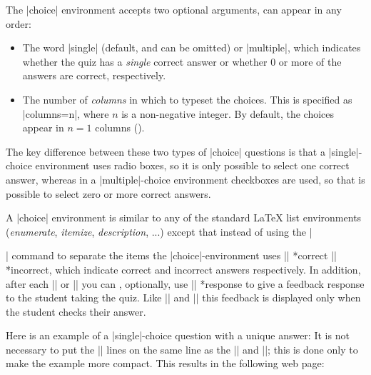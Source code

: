 \documentclass[svgnames]{article}
\begin{document}
The \LatexCode|choice| environment accepts two optional arguments,
can appear in any order:
\begin{itemize}
  \item{}
  The word \LatexCode|single| (default, and can be omitted) or
  \LatexCode|multiple|, which indicates whether the quiz has a
  \textit{single} correct answer or whether 0 or more of the answers are
  correct, respectively.
  \item {}
  The number of \textit{columns} in which to typeset the choices. This
  is specified as \LatexCode|columns=n|, where $n$ is a non-negative integer.
  By default, the choices appear in $n=1$ columns
  ().
\end{itemize}
The key difference between these two types of \LatexCode|choice|
questions is that a \LatexCode|single|-choice environment uses radio
boxes, so it is only possible to select one correct answer, whereas in a
\LatexCode|multiple|-choice environment checkboxes are used, so that is
possible to select zero or more correct answers.

A \LatexCode|choice| environment is similar to any of the standard
\LaTeX{} list environments (\textit{enumerate}, \textit{itemize},
\textit{description}, ...) except that instead of using the
\LatexCode|\item| command to separate the items the
\LatexCode|choice|-environment uses \LatexCode|\correct|
*{correct} \LatexCode|\incorrect|
*{incorrect}, which indicate correct
and incorrect answers respectively.  In addition, after each
\LatexCode|\correct| or \LatexCode|\incorrect| you can , optionally, use
\LatexCode|\response| *{response} to give
a feedback response to the student taking the quiz. Like
\LatexCode|\whenRight| and \LatexCode|\whenWrong| this feedback is
displayed only when the student checks their answer.

Here is an example of a \LatexCode|single|-choice question with a unique
answer:
It is not necessary to put the \LatexCode|\response| lines on the same
line as the \LatexCode|\incorrect| and \LatexCode|\incorrect|; this is
done only to make the example more compact. This results in the
following web page:
\end{document}
